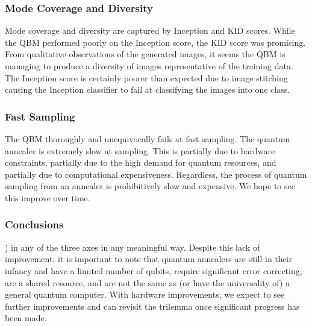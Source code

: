 \documentclass[technologies,article,accept,pdftex,moreauthors]{Definitions/mdpi}
\begin{document}
\subsubsection{Mode Coverage and Diversity}
Mode coverage and diversity are captured by Inception and KID scores. While the QBM performed poorly on the Inception score, the KID score was promising. From qualitative observations of the generated images, it seems the QBM is managing to produce a diversity of images representative of the training data. The Inception score is certainly poorer than expected due to image stitching causing the Inception classifier to fail at classifying the images into one class.

\subsubsection{Fast Sampling}
The QBM thoroughly and unequivocally fails at fast sampling. The quantum annealer is extremely slow at sampling. This is partially due to hardware constraints, partially due to the high demand for quantum resources, and partially due to computational expensiveness. Regardless, the process of quantum sampling from an annealer is prohibitively slow and expensive. We hope to see this improve over time.

\subsubsection{Conclusions}
) in any of the three axes in any meaningful way. Despite this lack of improvement, it is important to note that quantum annealers are still in their infancy and have a limited number of qubits, require significant error correcting, are a shared resource, and are not the same as (or have the universality of) a general quantum computer. With hardware improvements, we expect to see further improvements and can revisit the trilemma once significant progress has been made. %
\end{document}
